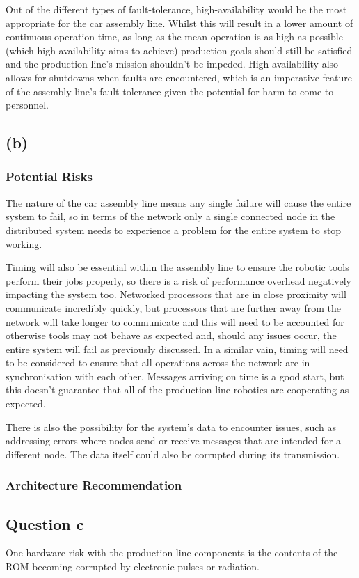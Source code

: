 \documentclass[]{report}
\begin{document}
				Out of the different types of fault-tolerance, high-availability would be the most appropriate for the car assembly line. Whilst this will result in a lower amount of continuous operation time, as long as the mean operation is as high as possible (which high-availability aims to achieve) production goals should still be satisfied and the production line's mission shouldn't be impeded. High-availability also allows for shutdowns when faults are encountered, which is an imperative feature of the assembly line's fault tolerance given the potential for harm to come to personnel.
			
			\subsection{(b)}
				\subsubsection{Potential Risks}
				The nature of the car assembly line means any single failure will cause the entire system to fail, so in terms of the network only a single connected node in the distributed system needs to experience a problem for the entire system to stop working. 
				
				Timing will also be essential within the assembly line to ensure the robotic tools perform their jobs properly, so there is a risk of performance overhead negatively impacting the system too. Networked processors that are in close proximity will communicate incredibly quickly, but processors that are further away from the network will take longer to communicate and this will need to be accounted for otherwise tools may not behave as expected and, should any issues occur, the entire system will fail as previously discussed. In a similar vain, timing will need to be considered to ensure that all operations across the network are in synchronisation with each other. Messages arriving on time is a good start, but this doesn't guarantee that all of the production line robotics are cooperating as expected.
				
				There is also the possibility for the system's data to encounter issues, such as addressing errors where nodes send or receive messages that are intended for a different node. The data itself could also be corrupted during its transmission.
				
				\subsubsection{Architecture Recommendation}
						
			
			\subsection{Question c}
			One hardware risk with the production line components is the contents of the ROM becoming corrupted by electronic pulses or radiation.


	
	
\end{document}

